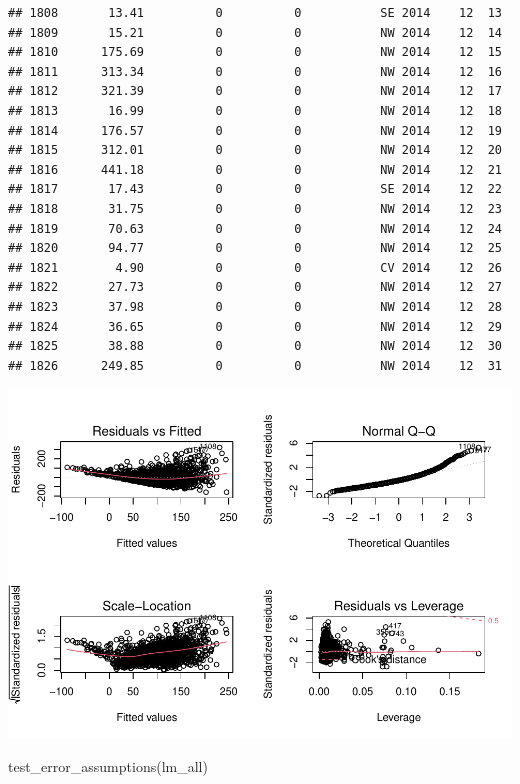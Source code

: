 \documentclass[
]{article}
\newenvironment{Shaded}{\begin{snugshade}}{\end{snugshade}}
\newcommand{\FunctionTok}[1]{\textcolor[rgb]{0.00,0.00,0.00}{#1}}
\newcommand{\NormalTok}[1]{#1}
\begin{document}
\begin{verbatim}
## 1808       13.41          0          0           SE 2014    12  13
## 1809       15.21          0          0           NW 2014    12  14
## 1810      175.69          0          0           NW 2014    12  15
## 1811      313.34          0          0           NW 2014    12  16
## 1812      321.39          0          0           NW 2014    12  17
## 1813       16.99          0          0           NW 2014    12  18
## 1814      176.57          0          0           NW 2014    12  19
## 1815      312.01          0          0           NW 2014    12  20
## 1816      441.18          0          0           NW 2014    12  21
## 1817       17.43          0          0           SE 2014    12  22
## 1818       31.75          0          0           NW 2014    12  23
## 1819       70.63          0          0           NW 2014    12  24
## 1820       94.77          0          0           NW 2014    12  25
## 1821        4.90          0          0           CV 2014    12  26
## 1822       27.73          0          0           NW 2014    12  27
## 1823       37.98          0          0           NW 2014    12  28
## 1824       36.65          0          0           NW 2014    12  29
## 1825       38.88          0          0           NW 2014    12  30
## 1826      249.85          0          0           NW 2014    12  31
\end{verbatim}

\includegraphics{Final_Project_1_files/figure-latex/unnamed-chunk-5-1.pdf}

\begin{Shaded}
\begin{Highlighting}[]
\FunctionTok{test\_error\_assumptions}\NormalTok{(lm\_all)}
\end{Highlighting}
\end{Shaded}
\end{document}
